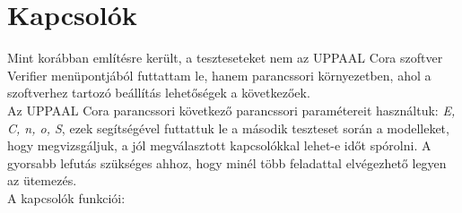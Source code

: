\documentclass [12pt]{report}
\begin{document}
   \section{Kapcsolók}
      Mint korábban említésre került, a teszteseteket nem az UPPAAL Cora szoftver Verifier menüpontjából futtattam le, hanem parancssori környezetben, ahol a szoftverhez tartozó beállítás lehetőségek a következőek.\\
   Az UPPAAL Cora parancssori következő parancssori paramétereit használtuk: \emph{E, C, n, o, S}, ezek segítségével futtattuk le a második teszteset során a modelleket, hogy megvizsgáljuk, a jól megválasztott kapcsolókkal lehet-e időt spórolni. A gyorsabb lefutás szükséges ahhoz, hogy minél több feladattal elvégezhető legyen az ütemezés.\\
   A kapcsolók funkciói:\\
\end{document}
